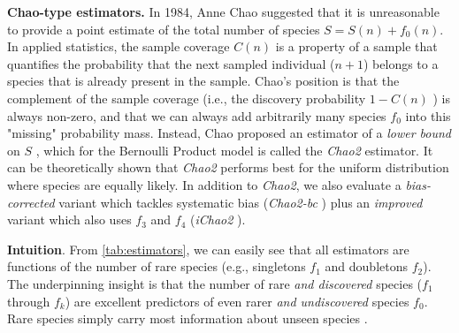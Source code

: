 \documentclass[conference]{IEEEtran}
\begin{document}
\textbf{Chao-type estimators.} In 1984, Anne Chao suggested that it is unreasonable to provide a point estimate of the total number of species $S=S(n)+f_0(n)$. In applied statistics, the sample coverage $C(n)$ is a property of a sample that quantifies the probability that the next sampled individual ($n+1$) belongs to a species that is already present in the sample. Chao's position is that the complement of the sample coverage (i.e., the discovery probability $1-C(n)$ \cite{boehme2021residual}) is always non-zero, and that we can always add arbitrarily many species $f_0$ into this "missing" probability mass. Instead, Chao proposed an estimator of a \emph{lower bound} on $S$ \cite{chao}, which for the Bernoulli Product model is called the \emph{Chao2} estimator. It can be theoretically shown that \emph{Chao2} performs best for the uniform distribution where species are equally likely. In addition to \emph{Chao2}, we also evaluate a \emph{bias-corrected} variant which tackles systematic bias (\emph{Chao2-bc} \cite{chao_bc}) plus an \emph{improved} variant which also uses $f_3$ and $f_4$ (\emph{iChao2} \cite{chiu2014}).

\textbf{Intuition}. From \autoref{tab:estimators}, we can easily see that all estimators are functions of the number of rare species (e.g., singletons $f_1$ and doubletons $f_2$). The underpinning insight is that the number of rare \emph{and discovered} species ($f_1$ through $f_k$) are excellent predictors of even rarer \emph{and undiscovered} species $f_0$. Rare species simply carry most information about unseen species \cite{incidenceSurvey}.
\end{document}
